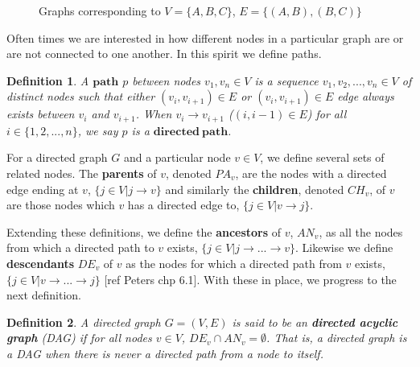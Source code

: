 \documentclass[12pt,twoside]{reedthesis}
\newtheorem{definition}{Definition}[section]
\theoremstyle{definition}
\begin{document}
\begin{figure}
\centering
{}
\caption{Graphs corresponding to $V = \{A,B,C\}$, $E = \{(A,B), (B,C)\}$ } \label{fig:M1}
\end{figure}

 Often times we are interested in how different nodes in a particular graph are or are not connected to one another. In this spirit we define paths.
 
\begin{definition}
A $\mathbf{path}$ $p$ between nodes $v_1, v_n \in V$ is a sequence $v_1, v_2, ..., v_n \in V$  of distinct nodes such that either $(v_i, v_{i+1}) \in E$ or $(v_i, v_{i+1}) \in E$ edge always exists between $v_i$ and $v_{i+1}$. When $v_i \rightarrow v_{i+1}$ ($(i, i-1) \in E$) for all $i \in \{1,2,...,n \}$, we say $p$ is a $\mathbf{directed \ path}$.
\end{definition}




For a directed graph $G$ and a particular node $v \in V$, we define several sets of related nodes. The \textbf{parents} of $v$, denoted $PA_v$, are the nodes with a directed edge ending at $v$, $\{j \in V | j \rightarrow v \}$ and similarly the \textbf{children}, denoted $CH_v$, of $v$ are those nodes which $v$ has a directed edge to, $\{j \in V | v \rightarrow j \}$. 

Extending these definitions, we define the \textbf{ancestors} of $v$, $AN_v$, as all the nodes from which a directed path to $v$ exists,  $\{j \in V | j \rightarrow ... \rightarrow v \}$. Likewise we define \textbf{descendants} $DE_v$ of $v$ as the nodes for which a directed path from $v$ exists,   $\{j \in V | v \rightarrow ... \rightarrow j\}$ [ref Peters chp 6.1]. With these in place, we progress to the next definition.

\begin{definition}
A directed graph $G = (V,E)$ is said to be an \emph{\textbf{directed acyclic graph}} (DAG) if for all nodes $v \in V$, $DE_v \cap AN_v = \emptyset$. That is, a directed graph is a DAG when there is never a directed path from a node to itself. 
\end{definition}
\end{document}
